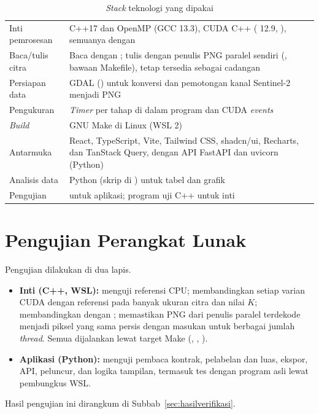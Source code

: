 \begin{table}[H]
\centering
\caption{\emph{Stack} teknologi yang dipakai}
\label{tab:stack}
\begin{tabularx}{\textwidth}{|L{4cm}|Y|}
\hline
{} &  \\ \hline
Inti pemrosesan & C++17 dan OpenMP (GCC 13.3), CUDA C++ ( 12.9, ), semuanya dengan  \\ \hline
Baca/tulis citra & Baca dengan ; tulis dengan penulis PNG paralel sendiri (, bawaan Makefile),  tetap tersedia sebagai cadangan \\ \hline
Persiapan data & GDAL () untuk konversi dan pemotongan kanal Sentinel-2 menjadi PNG \\ \hline
Pengukuran & \emph{Timer} per tahap di dalam program dan CUDA \emph{events} \\ \hline
\emph{Build} & GNU Make di Linux (WSL 2) \\ \hline
Antarmuka & React, TypeScript, Vite, Tailwind CSS, shadcn/ui, Recharts, dan TanStack Query, dengan API FastAPI dan uvicorn (Python) \\ \hline
Analisis data & Python (skrip di ) untuk tabel dan grafik \\ \hline
Pengujian &  untuk aplikasi; program uji C++ untuk inti \\ \hline
\end{tabularx}
\end{table}

\section{Pengujian Perangkat Lunak}
\label{sec:pengujianpl}
Pengujian dilakukan di dua lapis.
\begin{itemize}
    \item \textbf{Inti (C++, WSL):}  menguji referensi CPU;  membandingkan setiap varian CUDA dengan referensi pada banyak ukuran citra dan nilai $K$;  membandingkan  dengan ;  memastikan PNG dari penulis paralel terdekode menjadi piksel yang sama persis dengan masukan untuk berbagai jumlah \emph{thread}. Semua dijalankan lewat target Make (, , ).
    \item \textbf{Aplikasi (Python):}  menguji pembaca kontrak, pelabelan dan luas, ekspor, API, peluncur, dan logika tampilan, termasuk tes dengan program  asli lewat pembungkus WSL.
\end{itemize}
Hasil pengujian ini dirangkum di Subbab~\ref{sec:hasilverifikasi}.
